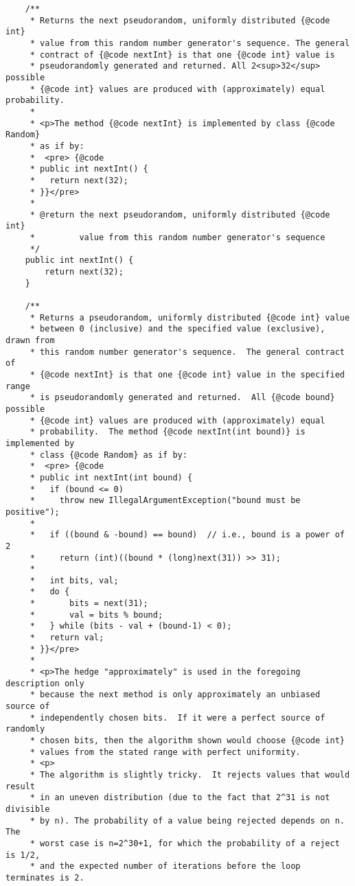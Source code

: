 \documentclass[12pt,a4paper,twoside,openright,titlepage,final]{article}
\begin{document}
\begin{verbatim}
    /**
     * Returns the next pseudorandom, uniformly distributed {@code int}
     * value from this random number generator's sequence. The general
     * contract of {@code nextInt} is that one {@code int} value is
     * pseudorandomly generated and returned. All 2<sup>32</sup> possible
     * {@code int} values are produced with (approximately) equal probability.
     *
     * <p>The method {@code nextInt} is implemented by class {@code Random}
     * as if by:
     *  <pre> {@code
     * public int nextInt() {
     *   return next(32);
     * }}</pre>
     *
     * @return the next pseudorandom, uniformly distributed {@code int}
     *         value from this random number generator's sequence
     */
    public int nextInt() {
        return next(32);
    }

    /**
     * Returns a pseudorandom, uniformly distributed {@code int} value
     * between 0 (inclusive) and the specified value (exclusive), drawn from
     * this random number generator's sequence.  The general contract of
     * {@code nextInt} is that one {@code int} value in the specified range
     * is pseudorandomly generated and returned.  All {@code bound} possible
     * {@code int} values are produced with (approximately) equal
     * probability.  The method {@code nextInt(int bound)} is implemented by
     * class {@code Random} as if by:
     *  <pre> {@code
     * public int nextInt(int bound) {
     *   if (bound <= 0)
     *     throw new IllegalArgumentException("bound must be positive");
     *
     *   if ((bound & -bound) == bound)  // i.e., bound is a power of 2
     *     return (int)((bound * (long)next(31)) >> 31);
     *
     *   int bits, val;
     *   do {
     *       bits = next(31);
     *       val = bits % bound;
     *   } while (bits - val + (bound-1) < 0);
     *   return val;
     * }}</pre>
     *
     * <p>The hedge "approximately" is used in the foregoing description only
     * because the next method is only approximately an unbiased source of
     * independently chosen bits.  If it were a perfect source of randomly
     * chosen bits, then the algorithm shown would choose {@code int}
     * values from the stated range with perfect uniformity.
     * <p>
     * The algorithm is slightly tricky.  It rejects values that would result
     * in an uneven distribution (due to the fact that 2^31 is not divisible
     * by n). The probability of a value being rejected depends on n.  The
     * worst case is n=2^30+1, for which the probability of a reject is 1/2,
     * and the expected number of iterations before the loop terminates is 2.

\end{verbatim}
\end{document}
